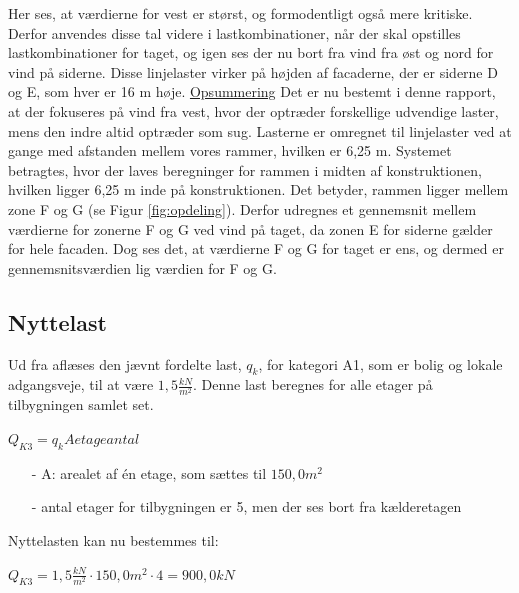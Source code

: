 Her ses, at værdierne for vest er størst, og formodentligt også mere kritiske. Derfor anvendes disse tal videre i lastkombinationer, når der skal opstilles lastkombinationer for taget, og igen ses der nu bort fra vind fra øst og nord for vind på siderne.
\newline \indent{     }  Disse linjelaster virker på højden af facaderne, der er siderne D og E, som hver er 16 m høje.
\newline
\newline
\underline{Opsummering}
\newline
Det er nu bestemt i denne rapport, at der fokuseres på vind fra vest, hvor der optræder forskellige udvendige laster, mens den indre altid optræder som sug. Lasterne er omregnet til linjelaster ved at gange med afstanden mellem vores rammer, hvilken er 6,25 m. 
\newline
\newline
Systemet betragtes, hvor der laves beregninger for rammen i midten af konstruktionen, hvilken ligger 6,25 m inde på konstruktionen. Det betyder, rammen ligger mellem zone F og G (se Figur \ref{fig:opdeling}). Derfor udregnes et gennemsnit mellem værdierne for zonerne F og G ved vind på taget, da zonen E for siderne gælder for hele facaden. 
Dog ses det, at værdierne F og G for taget er ens, og dermed er gennemsnitsværdien lig værdien for F og G. 

\subsection{Nyttelast}
Ud fra \citep[ tabel 6.2 kapitel 6.3.1.2]{EU91} aflæses den jævnt fordelte last, $q_k$, for kategori A1, som er bolig og lokale adgangsveje, til at være $1,\!5 \frac{kN}{m^2}$. Denne last beregnes for alle etager på tilbygningen samlet set.
\begin{center}
	$Q_{K3}=q_k A etageantal$
\end{center}
\begin{itemize}
	\item[-] A: arealet af én etage, som sættes til $150,\!0 m^2$
	\item[-] antal etager for tilbygningen er 5, men der ses bort fra kælderetagen
\end{itemize}
Nyttelasten kan nu bestemmes til:
\begin{center}
	$Q_{K3}=1,\!5 \frac{kN}{m^2}\cdot 150,\!0 m^2\cdot 4=900,\!0 kN$
\end{center}

